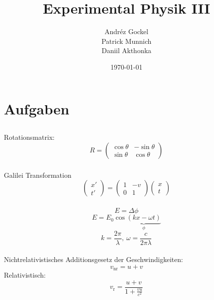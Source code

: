 \documentclass[12pt]{report}
\begin{document}
 
\title{Experimental Physik III}
\author{Andréz Gockel\\Patrick Munnich\\Daniil Akthonka}
 
\date{\today}
\maketitle

\chapter{Aufgaben}

\section{}

\subsection{}

Rotationsmatrix:
\[R=\begin{pmatrix}\cos\theta&-\sin\theta\\\sin\theta&\cos\theta\end{pmatrix}\]

\subsection{}

Galilei Transformation
\[\begin{pmatrix}x'\\t'\end{pmatrix}=\begin{pmatrix}1&-v\\0&1\end{pmatrix}\begin{pmatrix}x\\t\end{pmatrix}\]

\subsection{}

\[E=\Delta\phi\]
\[E=E_0\cos\underbrace{(kx-\omega t)}_{\phi}\]
\[k=\frac{2\pi}{\lambda},\ \omega=\frac{c}{2\pi\lambda}\]
\\
Nichtrelativistisches Additionsgesetz der Geschwindigkeiten:
\[v_\mathrm{nr}=u+v\]
Relativistisch:
\[v_\mathrm{r}=\frac{u+v}{1+\frac{vu}{c^2}}\]
\end{document}
